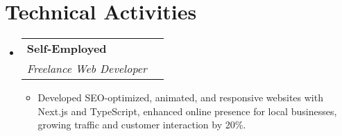 \documentclass[letterpaper,11pt]{article}
\makeatletter
\newcommand{\resumeItem}[1]{
\item\small{
{#1 \vspace{-2pt}}
}
}
\newcommand{\resumeSubheading}[4]{
\vspace{-2pt}\item
\begin{tabular*}{0.97\textwidth}[t]{l@{\extracolsep{\fill}}r}
\textbf{#1} & #2 \\
\textit{\small#3} & \textit{\small #4} \\
\end{tabular*}\vspace{-7pt}
}
\newcommand{\resumeSubHeadingListStart}{\begin{itemize}[leftmargin=0.15in, label={}]}
\newcommand{\resumeSubHeadingListEnd}{\end{itemize}}
\newcommand{\resumeItemListStart}{\begin{itemize}}
\newcommand{\resumeItemListEnd}{\end{itemize}\vspace{-5pt}}
\makeatother
\begin{document}
\section{Technical Activities}
\resumeSubHeadingListStart
\resumeSubheading{Self-Employed}{}{Freelance Web Developer}{}
\resumeItemListStart
\resumeItem{Developed SEO-optimized, animated, and responsive websites with Next.js and TypeScript, enhanced online presence for local businesses, growing traffic and customer interaction by 20\%.}
\resumeItemListEnd
\resumeSubHeadingListEnd

\end{document}
